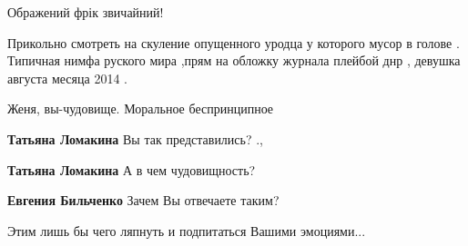 \begin{itemize}
 
Ображений фрік звичайний!

 

Прикольно смотреть на скуление опущенного уродца у которого мусор в голове .
Типичная нимфа руского мира ,прям на обложку журнала плейбой днр , девушка
августа месяца 2014 .


 
Женя, вы-чудовище. Моральное беспринципное

\begin{itemize}
 
\textbf{Татьяна Ломакина}
Вы так представились? .,

 
\textbf{Татьяна Ломакина} А в чем чудовищность?

 
\textbf{Евгения Бильченко}
Зачем Вы отвечаете таким?

Этим лишь бы чего ляпнуть и подпитаться Вашими эмоциями...


\end{itemize}
\end{itemize}
